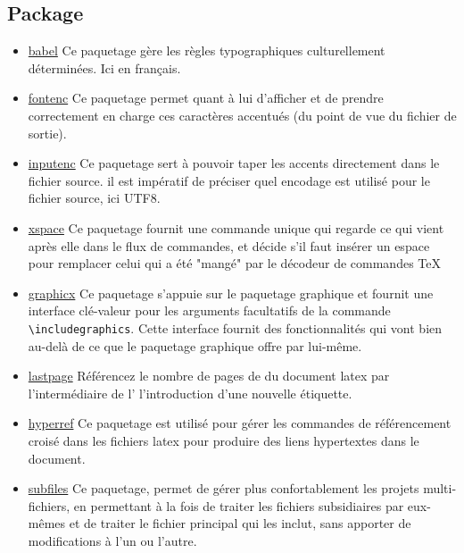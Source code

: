\subsection{Package}

\begin{itemize}
    \item \href{https://www.ctan.org/pkg/babel}{babel} Ce paquetage gère les règles
          typographiques culturellement déterminées. Ici en français.
    \item \href{https://ctan.org/pkg/fontenc}{fontenc} Ce paquetage permet quant à lui d’afficher et de
          prendre correctement en charge ces caractères accentués (du point de vue du fichier de sortie).
    \item \href{https://www.ctan.org/pkg/inputenc}{inputenc} Ce paquetage sert à pouvoir taper les accents
          directement dans le fichier source. il est impératif de préciser quel encodage est utilisé pour le fichier
          source, ici UTF8.
    \item \href{https://www.ctan.org/pkg/inputenc}{xspace} Ce paquetage fournit une commande unique qui regarde ce
          qui vient après elle dans le flux de commandes, et décide s'il faut insérer un espace pour remplacer
          celui qui a été "mangé" par le décodeur de commandes TeX
    \item \href{https://www.ctan.org/pkg/graphicx}{graphicx} Ce paquetage s'appuie sur
          le paquetage graphique et fournit une interface clé-valeur pour les arguments
          facultatifs de la commande \verb=\includegraphics=. Cette interface fournit des
          fonctionnalités qui vont bien au-delà de ce que le paquetage graphique offre par lui-même.
    \item \href{https://www.ctan.org/pkg/lastpage}{lastpage} Référencez le nombre de pages de du
          document \gls{latex} par l'intermédiaire de l'
          l'introduction d'une nouvelle étiquette.
    \item \href{https://www.ctan.org/pkg/hyperref}{hyperref} Ce paquetage est utilisé
          pour gérer les commandes de référencement croisé dans les fichiers
          \gls{latex} pour produire des liens hypertextes dans le document.
    \item \href{https://www.ctan.org/pkg/subfiles}{subfiles} Ce paquetage, permet de gérer plus confortablement les projets
          multi-fichiers, en permettant à la fois de traiter les fichiers subsidiaires par eux-mêmes et de traiter le
          fichier principal qui les inclut, sans apporter de modifications à l'un ou l'autre.

\end{itemize}
